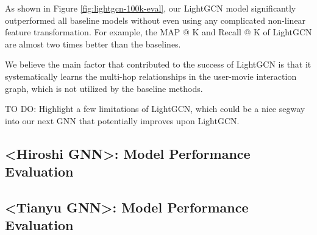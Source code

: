 \documentclass{article}
\begin{document}
As shown in Figure \ref{fig:lightgcn-100k-eval}, our LightGCN model significantly outperformed all baseline models without even using any complicated non-linear feature transformation. For example, the MAP @ K and Recall @ K of LightGCN are almost two times better than the baselines.

We believe the main factor that contributed to the success of LightGCN is that it systematically learns the multi-hop relationships in the user-movie interaction graph, which is not utilized by the baseline methods.

 TO DO: Highlight a few limitations of LightGCN, which could be a nice segway into our next GNN that potentially improves upon LightGCN.





\subsection{<Hiroshi GNN>: Model Performance Evaluation}

\subsection{<Tianyu GNN>: Model Performance Evaluation}



\end{document}
